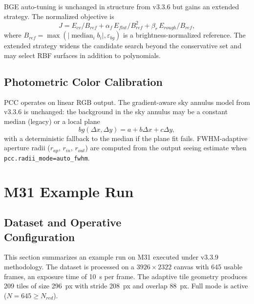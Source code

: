 \documentclass[10pt,twocolumn]{article}
\begin{document}
BGE auto-tuning is unchanged in structure from v3.3.6 but gains an extended strategy.
The normalized objective is
\begin{equation}
  J = E_{cv}/B_{ref} + \alpha_f\,E_{flat}/B_{ref}^2 + \beta_r\,E_{rough}/B_{ref},
\end{equation}
where $B_{ref}=\max(|\operatorname{median}_i b_i|,\varepsilon_{bg})$ is a brightness-normalized
reference. The extended strategy widens the candidate search beyond the conservative set and
may select RBF surfaces in addition to polynomials.

\subsection{Photometric Color Calibration}

PCC operates on linear RGB output. The gradient-aware sky annulus model from v3.3.6 is
unchanged: the background in the sky annulus may be a constant median (legacy) or a local plane
\begin{equation}
  bg(\Delta x,\Delta y) = a + b\Delta x + c\Delta y,
\end{equation}
with a deterministic fallback to the median if the plane fit fails.
FWHM-adaptive aperture radii ($r_{ap}$, $r_{in}$, $r_{out}$) are computed from the output
seeing estimate when \texttt{pcc.radii\_mode=auto\_fwhm}.

\section{M31 Example Run}

\subsection{Dataset and Operative \protect \\Configuration}

This section summarizes an example run on M31 executed under v3.3.9 methodology.
The dataset is processed on a $3926\times2322$ canvas with 645 usable frames, an exposure time
of 10~s per frame. The adaptive tile geometry produces 209 tiles of size \SI{296}{px} with
stride \SI{208}{px} and overlap \SI{88}{px}. Full mode is active ($N=645\ge N_{red}$).
\end{document}
